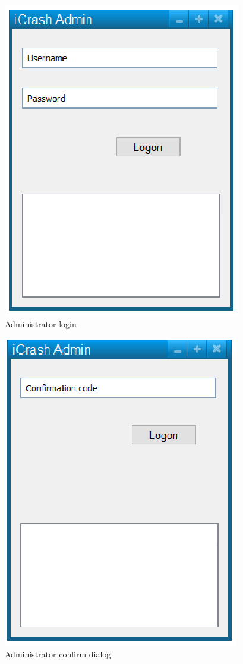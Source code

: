 \begin{figure}
  \centering
    \includegraphics{images/mockups/feature1-login/AdminLogon.eps}
  \caption{Administrator login}
  \label{fig:AdminLogin}
\end{figure}


\begin{figure}
  \centering
    \includegraphics{images/mockups/feature1-login/AdminConfirm.eps}
  \caption{Administrator confirm dialog}
  \label{fig:AdminConfirm}
\end{figure}


